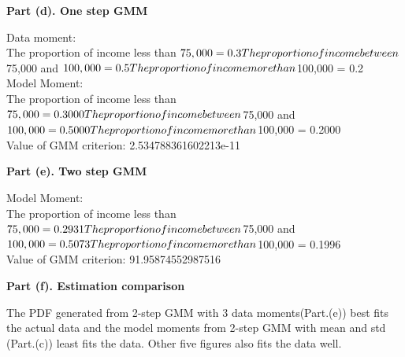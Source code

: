 \documentclass[letterpaper,12pt]{article}
\theoremstyle{definition}
\begin{document}
\begin{enumerate}
  \textbf{Part (d). One step GMM}
\par
\begin{figure}[H]\centering\captionsetup{width=4.0in}
\end{figure}
\par
Data moment: \\
The proportion of income less than $75,000 = 0.3 \\
The proportion of income between $75,000 and $100,000 = 0.5 \\
The proportion of income more than $100,000 = 0.2 \\
Model Moment: \\
The proportion of income less than $75,000 = 0.3000 \\
The proportion of income between $75,000 and $100,000 = 0.5000 \\
The proportion of income more than $100,000 = 0.2000 \\
Value of GMM criterion: 2.534788361602213e-11
\par\bigskip
\end {enumerate}

\begin{enumerate}
  \textbf{Part (e). Two step GMM}
\par
\begin{figure}[H]\centering\captionsetup{width=4.0in}
\end{figure}
\par
Model Moment: \\
The proportion of income less than $75,000 = 0.2931 \\
The proportion of income between $75,000 and $100,000 = 0.5073 \\
The proportion of income more than $100,000 = 0.1996 \\
Value of GMM criterion: 91.95874552987516
\par\bigskip
\end {enumerate}

\begin{enumerate}
  \textbf{Part (f). Estimation comparison} \\
\par\bigskip
The PDF generated from 2-step GMM with 3 data moments(Part.(e)) best fits\\
the actual data and the model moments from 2-step GMM with mean and std \\ (Part.(c)) least fits the data. Other five figures also fits the data well. \\
\par\bigskip
\end{enumerate}
\end{document}
